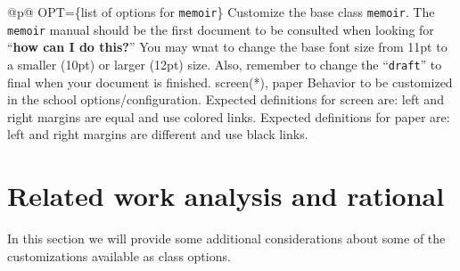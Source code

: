 \begin{ctabular}{@{}p{\linewidth}@{}}
    {OPT=\{list of options for \texttt{memoir}\}}%
    {Customize the base class \texttt{memoir}. The \texttt{memoir} manual should be the first document to be consulted when looking for “\textbf{how can I do this?}” You may wnat to change the base font size from 11pt to a smaller (10pt) or larger (12pt) size.  Also, remember to change the “\texttt{draft}” to final when your document is finished.}
    \midrule
    {screen(*), paper}%
    {Behavior to be customized in the school options/configuration. Expected definitions for screen are: left and right margins are equal and use colored links. Expected definitions for paper are: left and right margins are different and use black links.}
    \bottomrule
\end{ctabular}

\section{Related work analysis and rational} %
\label{sec:additional_considerations}

In this section we will provide some additional considerations about some of the customizations available as class options.



